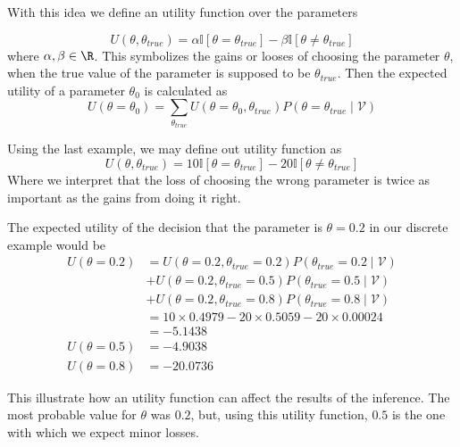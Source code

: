 With this idea we define an utility function over the parameters

\[
  U(\theta, \theta_{true}) = \alpha \mathbb{I}[\theta = \theta_{true}] - \beta
  \mathbb{I}[\theta \neq \theta_{true}]
\]
where \(\alpha, \beta \in \R\). This symbolizes the gains or looses of choosing
the parameter \(\theta\), when the true value of the parameter is supposed to be
\(\theta_{true}\). Then the expected utility of a parameter \(\theta_0\) is
calculated as
\[
  U(\theta = \theta_0) = \sum_{\theta_{true}}U(\theta = \theta_0,
  \theta_{true})P(\theta = \theta_{true}  \mid  \mathcal{V})
\]

Using the last example, we may define out utility function as
\[
  U(\theta, \theta_{true}) = 10\mathbb{I}[\theta = \theta_{true}] - 20
  \mathbb{I}[\theta \neq \theta_{true}]
\]
Where we interpret that the loss of choosing the wrong parameter is twice as
important as the gains from doing it right.

The expected utility of the decision that the parameter is \(\theta = 0.2\)
in our discrete example would be
\[
  \begin{aligned}
  U(\theta = 0.2) &= U(\theta = 0.2, \theta_{true} = 0.2)P(\theta_{true} = 0.2  \mid
  \mathcal{V})\\
  &+ U(\theta = 0.2, \theta_{true} = 0.5)P(\theta_{true} = 0.5  \mid
  \mathcal{V}) \\
  & +  U(\theta = 0.2, \theta_{true} = 0.8)P(\theta_{true} = 0.8  \mid  \mathcal{V})\\
  &= 10 \times 0.4979 - 20\times 0.5059 -20 \times 0.00024 \\
  &= -5.1438\\
  U(\theta = 0.5) &= -4.9038 \\
  U(\theta = 0.8) &= -20.0736
\end{aligned}
\]


This illustrate how an utility function can affect the results of the inference.
The most probable value for \(\theta\) was \(0.2\), but, using this utility
function, \(0.5\) is the one with which we expect minor losses.
